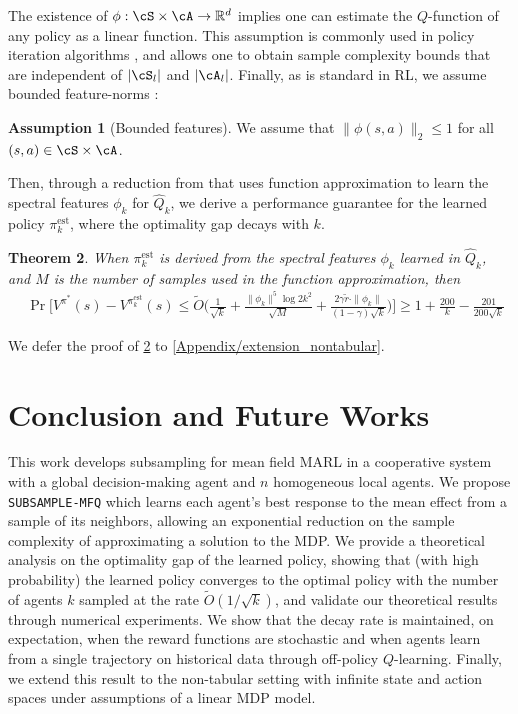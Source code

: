 \documentclass{article}
\newcommand\R{\mathbb{R}}
\theoremstyle{plain}
\newtheorem{theorem}{Theorem}[section]
\theoremstyle{definition}
\newtheorem{assumption}[theorem]{Assumption}
\def\est{\mathrm{est}}
\begin{document}
The existence of $\phi:\cS\times\cA\to\R^d$ implies one can estimate the $Q$-function of any policy as a linear function. This assumption is commonly used in policy iteration algorithms \cite{pmlr-v119-lattimore20a,wang2023centralizedtrainingdecentralizedexecution}, and allows one to obtain sample complexity bounds that are independent of $|\cS_l|$ and $|\cA_l|$. Finally, as is standard in RL, we assume bounded feature-norms \citep{tkachuk2023efficientplanningcombinatorialaction}:
\begin{assumption}[Bounded features] We assume that $\|\phi(s,a)\|_2\leq 1$ for all $(s,a)\in\cS\times\cA$.
\end{assumption}
Then, through a reduction from \citet{zhang2023provable,ren2024scalablespectralrepresentationsnetwork} that uses function approximation to learn the spectral features $\phi_k$ for $\hat{Q}_k$, we derive a performance guarantee for the learned policy $\pi_k^\est$, where the optimality gap decays with $k$.
    
\begin{theorem}\label{thm: extended_lfa}When ${\pi}^\est_{k}$ is derived from the spectral features $\phi_k$ learned in $\hat{Q}_k$, and $M$ is the number of samples used in the function approximation, then
\begin{align*}
    &\Pr\bigg[V^{\pi^*}(s) - V^{{\pi}^\est_{k}}(s)\leq\tilde{O}\bigg(\frac{1}{\sqrt{k}}+\frac{\|{\phi}_k\|^5\log 2k^2}{\sqrt{M}}+\frac{2\gamma \tilde{r}\cdot\|\phi_k\|}{(1-\gamma)\sqrt{k}}\bigg)\bigg] \geq 1+\frac{200}{k} - \frac{201}{200\sqrt{k}}
\end{align*}
\end{theorem}

We defer the proof of \cref{thm: extended_lfa} to \cref{Appendix/extension_nontabular}.




\section{Conclusion and Future Works}
This work develops subsampling for mean field MARL in a cooperative system with a global decision-making agent and $n$ homogeneous local agents. We propose \texttt{SUBSAMPLE-MFQ} which learns each agent’s best response to the mean effect from a sample of its neighbors, allowing an exponential reduction on the sample complexity of approximating a solution to the MDP. We provide a theoretical analysis on the optimality gap of the learned policy, showing that (with high probability) the learned policy converges to the optimal policy with the number of agents $k$ sampled at the rate $\tilde{O}(1/\sqrt{k})$, and validate our theoretical results through numerical experiments. We show that the decay rate is maintained, on expectation, when the reward functions are stochastic and when agents learn from a single trajectory on historical data through off-policy $Q$-learning. Finally, we extend this result to the non-tabular setting with infinite state and action spaces under assumptions of a linear MDP model.
\end{document}
